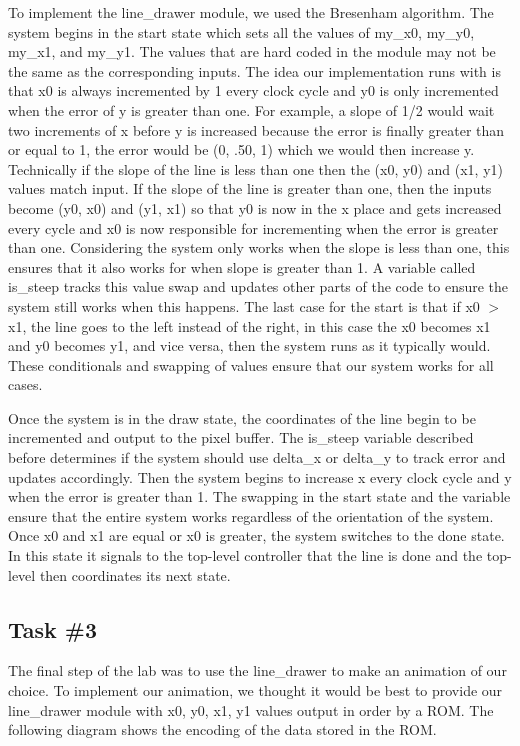 \documentclass[11pt, titlepage]{article}
\begin{document}
            
            
            To implement the line\_drawer module, we used the Bresenham algorithm. The system begins in the start state which sets all the values of my\_x0, my\_y0, my\_x1, and my\_y1. The values that are hard coded in the module may not be the same as the corresponding inputs. The idea our implementation runs with is that x0 is always incremented by 1 every clock cycle and y0 is only incremented when the error of y is greater than one. For example, a slope of 1/2 would wait two increments of x before y is increased because the error is finally greater than or equal to 1, the error would be (0, .50, 1) which we would then increase y. Technically if the slope of the line is less than one then the (x0, y0) and (x1, y1) values match input. If the slope of the line is greater than one, then the inputs become (y0, x0) and (y1, x1) so that y0 is now in the x place and gets increased every cycle and x0 is now responsible for incrementing when the error is greater than one. Considering the system only works when the slope is less than one, this ensures that it also works for when slope is greater than 1. A variable called is\_steep tracks this value swap and updates other parts of the code to ensure the system still works when this happens. The last case for the start is that if x0 $>$ x1, the line goes to the left instead of the right, in this case the x0 becomes x1 and y0 becomes y1, and vice versa, then the system runs as it typically would. These conditionals and swapping of values ensure that our system works for all cases. 
            
            Once the system is in the draw state, the coordinates of the line begin to be incremented and output to the pixel buffer. The is\_steep variable described before determines if the system should use delta\_x or delta\_y to track error and updates accordingly. Then the system begins to increase x every clock cycle and y when the error is greater than 1. The swapping in the start state and the variable ensure that the entire system works regardless of the orientation of the system. Once x0 and x1 are equal or x0 is greater, the system switches to the done state. In this state it signals to the top-level controller that the line is done and the top-level then coordinates its next state.
        
        \newpage
        \subsection{Task \#3}
            The final step of the lab was to use the line\_drawer to make an animation of our choice. To implement our animation, we thought it would be best to provide our line\_drawer module with x0, y0, x1, y1 values output in order by a ROM. The following diagram shows the encoding of the data stored in the ROM. 
           
\end{document}
